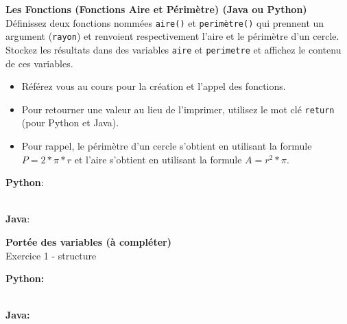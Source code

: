   \begin{Exercice}[5 minutes] \textbf{Les Fonctions (Fonctions Aire et Périmètre) (Java ou Python)}\\
      Définissez deux fonctions nommées \lstinline{aire()} et \lstinline{perimètre()} qui prennent un argument (\lstinline{rayon}) et renvoient respectivement l'aire et le périmètre d'un cercle. Stockez les résultats dans des variables \lstinline{aire} et \lstinline{perimetre} et affichez le contenu de ces variables.   \\
     
      \begin{conseil}
          \begin{itemize}
              \item Référez vous au cours pour la création et l'appel des fonctions.
              \item Pour retourner une valeur au lieu de l'imprimer, utilisez le mot clé \lstinline{return} (pour Python et Java).
              \item Pour rappel, le périmètre d'un cercle s'obtient en utilisant la formule $P = 2*\pi*r$ et l'aire s'obtient en utilisant la formule $A = r^2*\pi$.
          \end{itemize}        
      \end{conseil}
      \begin{solution}
          \textbf{Python}:
          
          \textbf{\\Java}:
      \end{solution}   
  \end{Exercice} 

  \begin{Exercice}[5 minutes] \textbf{Portée des variables (à compléter)}\\
    Exercice 1 - structure \\
    
     \begin{conseil}
         
     \end{conseil}
     \begin{solution}
     
     \textbf{Python:} 
     
     \textbf{\\Java:} 
        
         
     \end{solution}   
 \end{Exercice}

